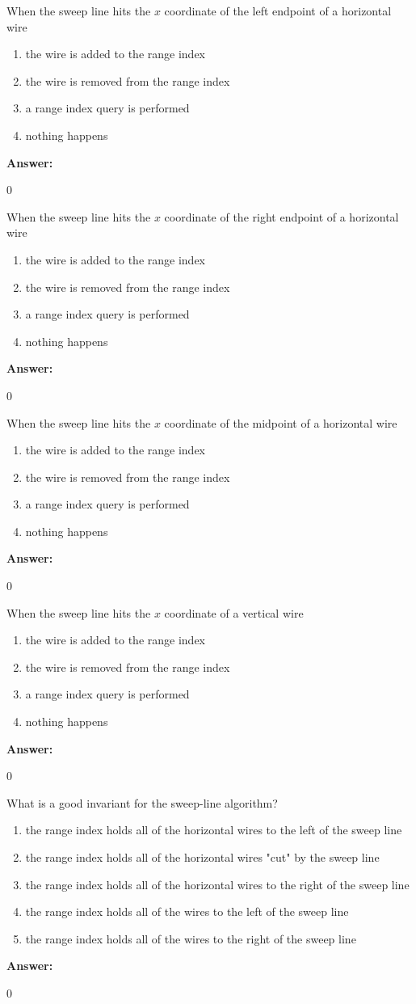 \documentclass[12pt,twoside]{article}
\newcommand{\answer}{
 \par\medskip
 \textbf{Answer:}
}
\newcommand{\answerIId}{ \answer
0
}
\newcommand{\answerIIe}{ \answer
0
}
\newcommand{\answerIIf}{ \answer
0
}
\newcommand{\answerIIg}{ \answer
0
}
\newcommand{\answerIIh}{ \answer
0
}
\begin{document}
\begin{problems}
\begin{problemparts}
\problempart {} When the sweep line hits the $x$ coordinate of the
left endpoint of a horizontal wire
\begin{enumerate}
  \item the wire is added to the range index
  \item the wire is removed from the range index
  \item a range index query is performed
  \item nothing happens
\end{enumerate}
\answerIId

\problempart {} When the sweep line hits the $x$ coordinate of the right
endpoint of a horizontal wire
\begin{enumerate}
  \item the wire is added to the range index
  \item the wire is removed from the range index
  \item a range index query is performed
  \item nothing happens
\end{enumerate}
\answerIIe

\problempart {} When the sweep line hits the $x$ coordinate of the midpoint
of a horizontal wire
\begin{enumerate}
  \item the wire is added to the range index
  \item the wire is removed from the range index
  \item a range index query is performed
  \item nothing happens
\end{enumerate}
\answerIIf

\problempart When the sweep line hits the $x$ coordinate of a vertical wire
\begin{enumerate}
  \item the wire is added to the range index
  \item the wire is removed from the range index
  \item a range index query is performed
  \item nothing happens
\end{enumerate}
\answerIIg

\problempart {} What is a good invariant for the sweep-line algorithm?
\begin{enumerate}
  \item the range index holds all of the horizontal wires to the left of the
    sweep line
  \item the range index holds all of the horizontal wires "cut" by the sweep line
  \item the range index holds all of the horizontal wires to the right of the
    sweep line
  \item the range index holds all of the wires to the left of the sweep line
  \item the range index holds all of the wires to the right of the sweep line
\end{enumerate}
\answerIIh


\end{problemparts}
\end{problems}
\end{document}
